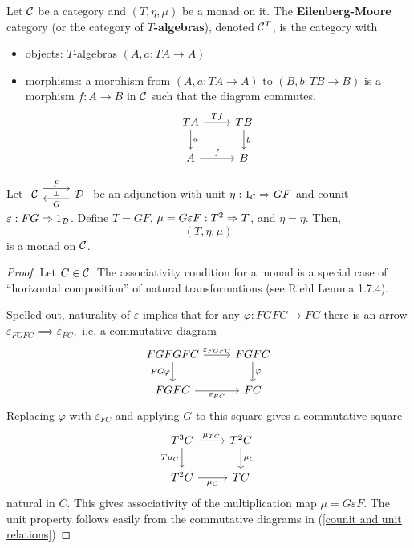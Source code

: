 \documentclass[12pt]{article}
\begin{document}
\begin{defn}
    Let $\mathcal{C}$ be a category and $(T,\eta,\mu)$ be a monad on it. The \textbf{Eilenberg-Moore} category (or the category of \textbf{$T$-algebras}), denoted $\mathcal{C}^T$, is the category with
    \begin{itemize}
        \item objects: $T$-algebras $(A,a:TA\to A)$
        \item morphisms: a morphism from $(A,a:TA\to A)$ to $(B,b:TB\to B)$ is a morphism $f:A\to B$ in $\mathcal{C}$ such that the diagram commutes.
        \[\begin{tikzcd}
            TA \dar["a"]\rar["Tf"] & TB\dar["b"]\\
            A \rar["f"] & B
        \end{tikzcd}\]
    \end{itemize}
\end{defn}

\begin{prop}
    Let $\adjunction{\cC}{\cD}{F}{G}$ be an adjunction with unit $\eta: 1_{\mathcal{C}} \Rightarrow GF$ and counit $\varepsilon: FG \Rightarrow 1_{\mathcal{D}}$. Define $T=GF$, $\mu=G\varepsilon F: T^2 \Rightarrow T$, and $\eta = \eta$. Then,
    \[(T,\eta,\mu)\]
    is a monad on $\mathcal{C}$.
\end{prop}

\begin{proof}
    Let $C\in\mathcal{C}.$ The associativity condition for a monad is a special case of ``horizontal composition'' of natural transformations (see Riehl Lemma 1.7.4).
    
    Spelled out, naturality of $\varepsilon$ implies that for any $\varphi:FGFC\to FC$ there is an arrow $\varepsilon_{FGFC}\implies\varepsilon_{FC},$ i.e. a commutative diagram
    \[\begin{tikzcd}
        FGFGFC \dar["FG\varphi",swap]\rar["\varepsilon_{FGFC}"] & FGFC\dar["\varphi"]\\
        FGFC \rar["\varepsilon_{FC}",swap] & FC
    \end{tikzcd}\]
    Replacing $\varphi$ with $\varepsilon_{FC}$ and applying $G$ to this square gives a commutative square \[\begin{tikzcd}
        T^3C \dar["T\mu_C",swap]\rar["\mu_{TC}"] & T^2C\dar["\mu_C"]\\
        T^2C \rar["\mu_C",swap] & TC
    \end{tikzcd}\]
    natural in $C.$ This gives associativity of the multiplication map $\mu=G\varepsilon F.$ The unit property follows easily from the commutative diagrams in (\ref{counit and unit relations})
\end{proof}
\end{document}
